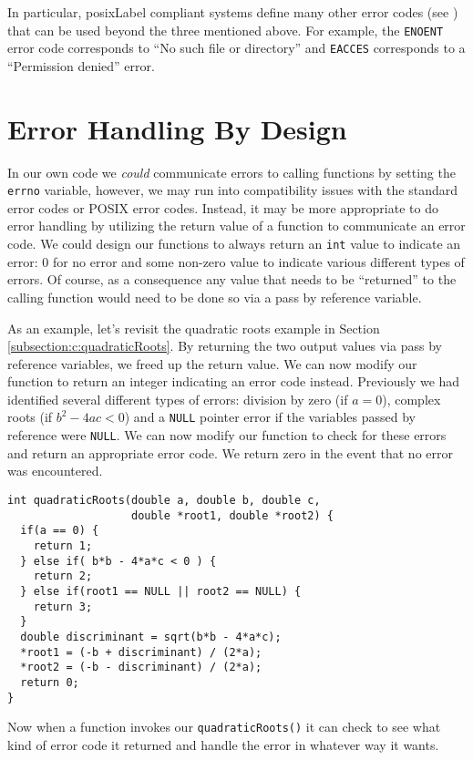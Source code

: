 In particular, \gls{posixLabel} compliant systems define many other error 
codes (see \cite{posixErrno}) that can be used beyond the three
mentioned above.  For example, the \texttt{ENOENT} error
code corresponds to ``No such file or directory'' and \texttt{EACCES}
corresponds to a ``Permission denied'' error.

\section{Error Handling By Design}

In our own code we \emph{could} communicate errors to calling
functions by setting the \texttt{errno} variable, however, we may run 
into compatibility issues with the standard error codes or POSIX 
error codes.  Instead, it may be more appropriate to do error 
handling by utilizing the return value of a function to communicate
an error code.  We could design our functions to always
return an \texttt{int} value to indicate an error: 0 for no error
and some non-zero value to indicate various different types of errors.
Of course, as a consequence any value that needs to be ``returned''
to the calling function would need to be done so via a pass by reference
variable.  

As an example, let's revisit the quadratic roots example in Section
\ref{subsection:c:quadraticRoots}.  By returning the two output values
via pass by reference variables, we freed up the return value.  We
can now modify our function to return an integer indicating an
error code instead. Previously we had identified several different types of errors: division
by zero (if $a = 0$), complex roots (if $b^2 - 4ac < 0$) and a 
\texttt{NULL} pointer error if the variables passed by reference
were \texttt{NULL}.  We can now modify our function to 
check for these errors and return an appropriate error code.
We return zero in the event that no error was encountered.

\begin{verbatim}
int quadraticRoots(double a, double b, double c, 
                   double *root1, double *root2) {
  if(a == 0) {
    return 1;
  } else if( b*b - 4*a*c < 0 ) {
    return 2;
  } else if(root1 == NULL || root2 == NULL) {
    return 3;
  }
  double discriminant = sqrt(b*b - 4*a*c);
  *root1 = (-b + discriminant) / (2*a);
  *root2 = (-b - discriminant) / (2*a);
  return 0;
}
\end{verbatim}

Now when a function invokes our \texttt{quadraticRoots()}
it can check to see what kind of error code it returned and
handle the error in whatever way it wants.  

